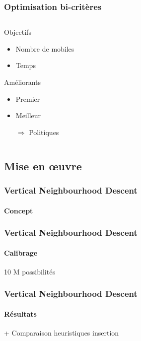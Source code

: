 \begin{frame}
	\frametitle{Optimisation bi-critères}
	\begin{columns}
		\begin{column}{.37\linewidth}
			\begin{alertblock}{Objectifs}
				\begin{itemize}
					\item Nombre de mobiles
					\item Temps
				\end{itemize}
			\end{alertblock}
			\begin{exampleblock}{Améliorants}
				\begin{itemize}
					\item Premier
					\item Meilleur
					\item[$\Rightarrow$] Politiques
				\end{itemize}
			\end{exampleblock}
		\end{column}
		\begin{column}{.63\linewidth}
			\begin{center}
			
			\end{center}
		\end{column}
	\end{columns}
\end{frame}

\subsection{Mise en \oe uvre}
\begin{frame}
	\frametitle{Vertical Neighbourhood Descent}
	\framesubtitle{Concept}
\end{frame}
\begin{frame}
	\frametitle{Vertical Neighbourhood Descent}
	\framesubtitle{Calibrage}
	10 M possibilités
\end{frame}
\begin{frame}
	\frametitle{Vertical Neighbourhood Descent}
	\framesubtitle{Résultats}
	+ Comparaison heuristiques insertion
\end{frame}
